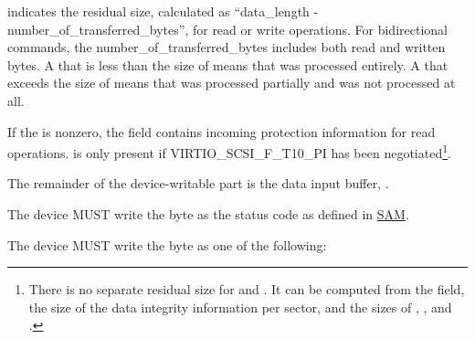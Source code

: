  indicates the residual size,
calculated as ``data_length - number_of_transferred_bytes'', for
read or write operations. For bidirectional commands, the
number_of_transferred_bytes includes both read and written bytes.
A  that is less than the size of  means that
 was processed entirely. A  that
exceeds the size of  means that  was
processed partially and  was not processed at
all.

If the  is nonzero, the  field contains
incoming protection information for read operations.   is
only present if VIRTIO_SCSI_F_T10_PI has been negotiated\footnote{There
  is no separate residual size for  and
  .  It can be computed from the  field,
  the size of the data integrity information per sector, and the sizes
  of , ,  and .}.

The remainder of the device-writable part is the data input buffer,
.



The device MUST write the  byte as the status code as
defined in \hyperref[intro:SAM]{SAM}.

The device MUST write the  byte as one of the following:

